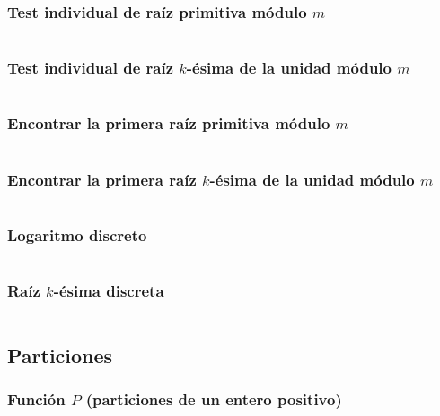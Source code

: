 \documentclass[11pt]{article}
\begin{document}
			\subsubsection{Test individual de raíz primitiva módulo $m$}
			\inputminted[tabsize=2,breaklines,firstline=327,lastline=337,fontsize=\small]{c++}{numberTheory.cpp}
			
			\subsubsection{Test individual de raíz $k$-ésima de la unidad módulo $m$}
			\inputminted[tabsize=2,breaklines,firstline=339,lastline=348,fontsize=\small]{c++}{numberTheory.cpp}
			
			\subsubsection{Encontrar la primera raíz primitiva módulo $m$}
			\inputminted[tabsize=2,breaklines,firstline=350,lastline=367,fontsize=\small]{c++}{numberTheory.cpp}
			
			\subsubsection{Encontrar la primera raíz $k$-ésima de la unidad módulo $m$}
			\inputminted[tabsize=2,breaklines,firstline=369,lastline=385,fontsize=\small]{c++}{numberTheory.cpp}
			
			\subsubsection{Logaritmo discreto}
			\inputminted[tabsize=2,breaklines,firstline=387,lastline=410,fontsize=\small]{c++}{numberTheory.cpp}
			
			\subsubsection{Raíz $k$-ésima discreta}
			\inputminted[tabsize=2,breaklines,firstline=412,lastline=429,fontsize=\small]{c++}{numberTheory.cpp}
			
		\subsection{Particiones}
			\subsubsection{Función $P$ (particiones de un entero positivo)}
			\inputminted[tabsize=2,breaklines,firstline=544,lastline=576,fontsize=\small]{c++}{numberTheory.cpp}
			
\end{document}

